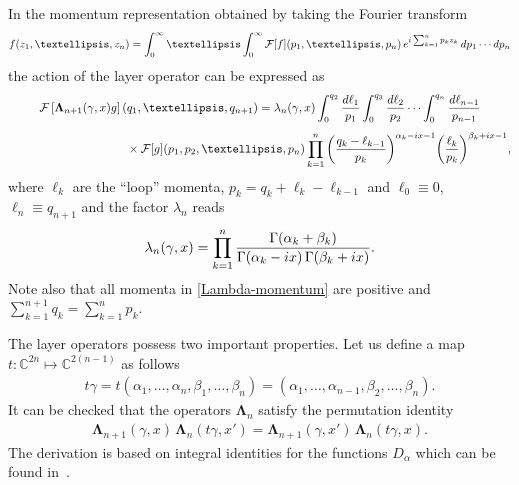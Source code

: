 \documentclass[11pt]{article}
\numberwithin{equation}{section}
\numberwithin{equation}{section}
\begin{document}
In the momentum representation obtained by taking the Fourier transform
\begin{gather*}
f(z_1,\dots, z_n)=\int_{0}^\infty\dots\int_0^\infty \mathcal{F}[f](p_1,\dots, p_n) \,{\rm e}^{{\rm i}\sum_{k=1}^n p_k z_k}\, {\rm d}p_1\cdots {\rm d}p_n
\end{gather*}
the action of the layer operator can be expressed as
\begin{gather}
\mathcal{F}\left[\boldsymbol\Lambda_{n+1}(\gamma,x) g\right](q_1,\dots,q_{n+1})
 =\lambda_n(\gamma,x)\int_{0}^{q_2} \frac{{\rm d}\ell_1}{p_1}\int_{0}^{q_3}
 \frac{{\rm d}\ell_2}{p_2} \cdots \int_{0}^{q_n} \frac{{\rm d}\ell_{n-1}}{p_{n-1}}\notag
 \\[1ex] \hphantom{\mathcal{F}\left[\boldsymbol\Lambda_{n+1}(\gamma,x) g\right] =\qquad}
 {}\times \mathcal{F}[g](p_1,p_2,\dots,p_n)\prod_{k=1}^{n}
 \bigg(\frac{q_k-\ell_{k-1}}{p_k}\bigg)^{\alpha_k-{\rm i}x-1}
 \bigg(\frac{\ell_k}{p_k}\bigg)^{\beta_k+{\rm i}x-1},\label{Lambda-momentum}
\end{gather}
where $\ell_k$ are the ``loop'' momenta, $ p_k= q_k+\ell_k-\ell_{k-1}$ and $ \ell_0\equiv 0$, $\ell_n\equiv q_{n+1}$ and the factor $\lambda_n$ reads
\begin{gather*}
\lambda_n(\gamma,x)=\prod_{k=1}^{n}\frac{\Gamma(\alpha_k+\beta_k)}{\Gamma(\alpha_k-{\rm i}x)\,\Gamma(\beta_k+{\rm i}x)}.
\end{gather*}
Note also that all momenta in \eqref{Lambda-momentum} are positive and $\sum_{k=1}^{n+1} q_k=\sum_{k=1}^n p_k$.


The layer operators possess two important properties. Let us define a map $t\colon \mathbb C^{2n} \mapsto \mathbb C^{2(n-1)}$ as follows
\begin{gather*}%
{t}\gamma= t(\alpha_1,\dots,\alpha_{n},\beta_{1},\dots,\beta_{n})= (\alpha_1,\dots,\alpha_{n-1},\beta_{2},\dots,\beta_{n}).
\end{gather*}
It can be checked that the operators $\boldsymbol \Lambda_n$ satisfy the permutation identity
 \begin{gather}\label{Lambda-permutation-identity}
\boldsymbol\Lambda_{n+1}(\gamma,x)\,\boldsymbol\Lambda_n(t\gamma,x')
 =\boldsymbol\Lambda_{n+1}(\gamma,x')\,\boldsymbol\Lambda_n(t\gamma,x).
\end{gather}
The derivation is based on integral identities for the functions $D_\alpha$ which can be found in~\cite{Derkachov:2002tf}.
\end{document}
